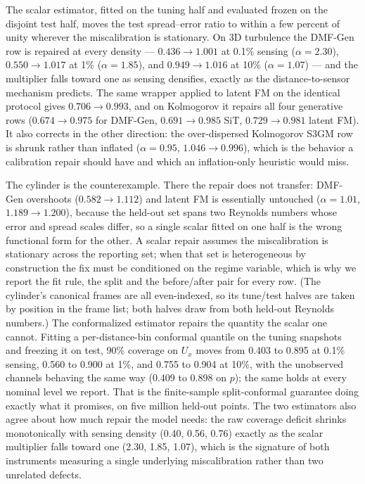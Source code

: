 \documentclass[aip,pof,reprint,amsmath,amssymb,superscriptaddress]{revtex4-1}
\newcommand{\dmfgen}{DMF-Gen}
\begin{document}
The scalar estimator, fitted on the tuning half and evaluated frozen on the
disjoint test half, moves the test spread--error ratio to within a few percent
of unity wherever the miscalibration is stationary. On 3D turbulence the
\dmfgen{} row is repaired at every density --- $0.436\!\to\!1.001$ at 0.1\%
sensing ($\alpha{=}2.30$), $0.550\!\to\!1.017$ at 1\% ($\alpha{=}1.85$), and
$0.949\!\to\!1.016$ at 10\% ($\alpha{=}1.07$) --- and the multiplier falls
toward one as sensing densifies, exactly as the distance-to-sensor mechanism
predicts. The same wrapper applied to latent FM on the identical protocol
gives $0.706\!\to\!0.993$, and on Kolmogorov it repairs all four generative
rows ($0.674\!\to\!0.975$ for \dmfgen{}, $0.691\!\to\!0.985$ SiT,
$0.729\!\to\!0.981$ latent FM). It also corrects in the other direction: the
over-dispersed Kolmogorov S3GM row is shrunk rather than inflated
($\alpha{=}0.95$, $1.046\!\to\!0.996$), which is the behavior a calibration
repair should have and which an inflation-only heuristic would miss.

The cylinder is the counterexample. There the repair does not transfer: \dmfgen{} overshoots ($0.582\!\to\!1.112$) and
latent FM is essentially untouched ($\alpha{=}1.01$, $1.189\!\to\!1.200$),
because the held-out set spans two Reynolds numbers whose error and spread
scales differ, so a single scalar fitted on one half is the wrong functional
form for the other. A scalar repair assumes the miscalibration is stationary
across the reporting set; when that set is heterogeneous by construction the
fix must be conditioned on the regime variable, which is why we report the
fit rule, the split and the before/after pair for every row. (The cylinder's
canonical frames are all even-indexed, so its tune/test halves are taken by
position in the frame list; both halves draw from both held-out Reynolds
numbers.)
The conformalized estimator repairs the quantity the scalar one cannot.
Fitting a per-distance-bin conformal quantile on the tuning snapshots and
freezing it on test, 90\% coverage on $U_x$ moves from 0.403 to 0.895 at 0.1\%
sensing, 0.560 to 0.900 at 1\%, and 0.755 to 0.904 at 10\%, with the
unobserved channels behaving the same way (0.409 to 0.898 on $p$); the same
holds at every nominal level we report. That is the finite-sample
split-conformal guarantee doing exactly what it promises, on five million
held-out points. The two estimators also agree about how much repair the model
needs: the raw coverage deficit shrinks monotonically with sensing density
(0.40, 0.56, 0.76) exactly as the scalar multiplier falls toward one (2.30,
1.85, 1.07), which is the signature of both instruments measuring a single
underlying miscalibration rather than two unrelated defects.
\end{document}

